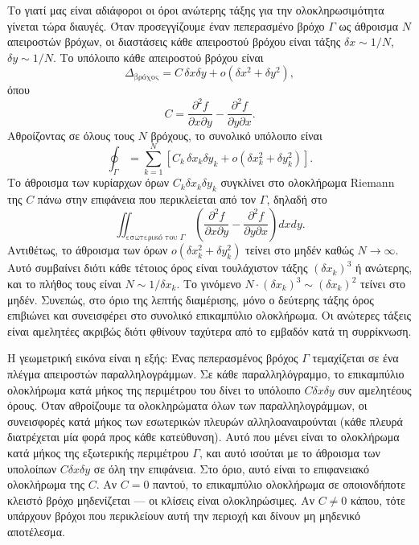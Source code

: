 \documentclass[11pt,a4paper,twoside,openright]{book}
\begin{document}
Το γιατί μας είναι αδιάφοροι οι όροι ανώτερης τάξης για την ολοκληρωσιμότητα γίνεται τώρα διαυγές. Όταν προσεγγίζουμε έναν πεπερασμένο βρόχο \(\Gamma\) ως άθροισμα \(N\) απειροστών βρόχων, οι διαστάσεις κάθε απειροστού βρόχου είναι τάξης \(\delta x \sim 1/N\), \(\delta y \sim 1/N\). Το υπόλοιπο κάθε απειροστού βρόχου είναι
\begin{equation}
\Delta_{\text{βρόχος}} = C \, \delta x \delta y + o(\delta x^2 + \delta y^2),
\end{equation}
όπου
\begin{equation}
C = \frac{\partial^2 f}{\partial x \partial y} - \frac{\partial^2 f}{\partial y \partial x}.
\end{equation}
Αθροίζοντας σε όλους τους \(N\) βρόχους, το συνολικό υπόλοιπο είναι
\begin{equation}
\oint_\Gamma = \sum_{k=1}^{N} \left[ C_k \, \delta x_k \delta y_k + o(\delta x_k^2 + \delta y_k^2) \right].
\end{equation}
Το άθροισμα των κυρίαρχων όρων \(C_k \delta x_k \delta y_k\) συγκλίνει στο ολοκλήρωμα Riemann της \(C\) πάνω στην επιφάνεια που περικλείεται από τον \(\Gamma\), δηλαδή στο
\begin{equation}
\iint_{\text{εσωτερικό του } \Gamma} \left( \frac{\partial^2 f}{\partial x \partial y} - \frac{\partial^2 f}{\partial y \partial x} \right) dx dy.
\end{equation}
Αντιθέτως, το άθροισμα των όρων \(o(\delta x_k^2 + \delta y_k^2)\) τείνει στο μηδέν καθώς \(N \to \infty\). Αυτό συμβαίνει διότι κάθε τέτοιος όρος είναι τουλάχιστον τάξης \((\delta x_k)^3\) ή ανώτερης, και το πλήθος τους είναι \(N \sim 1/\delta x_k\). Το γινόμενο \(N \cdot (\delta x_k)^3 \sim (\delta x_k)^2\) τείνει στο μηδέν. Συνεπώς, στο όριο της λεπτής διαμέρισης, μόνο ο δεύτερης τάξης όρος επιβιώνει και συνεισφέρει στο συνολικό επικαμπύλιο ολοκλήρωμα. Οι ανώτερες τάξεις είναι αμελητέες ακριβώς διότι φθίνουν ταχύτερα από το εμβαδόν κατά τη συρρίκνωση.

Η γεωμετρική εικόνα είναι η εξής: Ένας πεπερασμένος βρόχος \(\Gamma\) τεμαχίζεται σε ένα πλέγμα απειροστών παραλληλογράμμων. Σε κάθε παραλληλόγραμμο, το επικαμπύλιο ολοκλήρωμα κατά μήκος της περιμέτρου του δίνει το υπόλοιπο \(C \delta x \delta y\) συν αμελητέους όρους. Όταν αθροίζουμε τα ολοκληρώματα όλων των παραλληλογράμμων, οι συνεισφορές κατά μήκος των εσωτερικών πλευρών αλληλοαναιρούνται (κάθε πλευρά διατρέχεται μία φορά προς κάθε κατεύθυνση). Αυτό που μένει είναι το ολοκλήρωμα κατά μήκος της εξωτερικής περιμέτρου \(\Gamma\), και αυτό ισούται με το άθροισμα των υπολοίπων \(C \delta x \delta y\) σε όλη την επιφάνεια. Στο όριο, αυτό είναι το επιφανειακό ολοκλήρωμα της \(C\). Αν \(C = 0\) παντού, το επικαμπύλιο ολοκλήρωμα σε οποιονδήποτε κλειστό βρόχο μηδενίζεται --- οι κλίσεις είναι ολοκληρώσιμες. Αν \(C \neq 0\) κάπου, τότε υπάρχουν βρόχοι που περικλείουν αυτή την περιοχή και δίνουν μη μηδενικό αποτέλεσμα.
\end{document}
